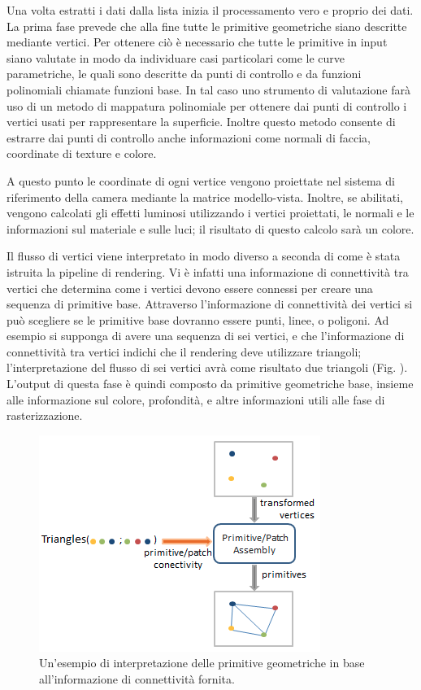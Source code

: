 Una volta estratti i dati dalla lista inizia il processamento vero e proprio dei dati. La prima fase prevede che alla fine tutte le primitive geometriche siano descritte mediante vertici. Per ottenere ciò è necessario che tutte le primitive in input siano valutate in modo da individuare casi particolari come le curve parametriche, le quali sono descritte da punti di controllo e da funzioni polinomiali chiamate funzioni base. In tal caso uno strumento di valutazione farà uso di un metodo di mappatura polinomiale per ottenere dai punti di controllo i vertici usati per rappresentare la superficie. Inoltre questo metodo consente di estrarre dai punti di controllo anche informazioni come normali di faccia, coordinate di texture e colore. 

A questo punto le coordinate di ogni vertice vengono proiettate nel sistema di riferimento della camera mediante la matrice modello-vista. Inoltre, se abilitati, vengono calcolati gli effetti luminosi utilizzando i vertici proiettati, le normali  e le informazioni sul materiale e sulle luci; il risultato di questo calcolo sarà un colore.

Il flusso di vertici viene interpretato in modo diverso a seconda di come è stata istruita la pipeline di rendering. Vi è infatti una informazione di connettività tra vertici che determina come i vertici devono essere connessi per creare una sequenza di primitive base. Attraverso l’informazione di connettività dei vertici si può scegliere se le primitive base dovranno essere punti, linee, o poligoni. Ad esempio si supponga di avere una sequenza di sei vertici, e che l’informazione di connettività tra vertici indichi che il rendering deve utilizzare triangoli; l’interpretazione del flusso di sei vertici avrà come risultato due triangoli (Fig. ). 
L’output di questa fase è quindi composto da primitive geometriche base, insieme alle informazione sul colore, profondità, e altre informazioni utili alle fase di rasterizzazione.
\\
\begin{figure}[htb]
 \centering
 \includegraphics[width=0.5\linewidth]{images/chapter_stato_arte/stato_arte_prim_ass.png}\hfill
 \caption[Primitive Assembly]{Un'esempio di interpretazione delle primitive geometriche in base all'informazione di connettività fornita.}
 \label{fig:stato_arte_prim_ass}
\end{figure}

